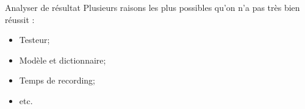 \begin{frame}{Analyser de résultat}
Plusieurs raisons les plus possibles qu'on n'a pas très bien réussit :
\begin{itemize}
\item Testeur;
\item Modèle et dictionnaire;
\item Temps de recording;
\item etc.
\end{itemize}
\end{frame}
